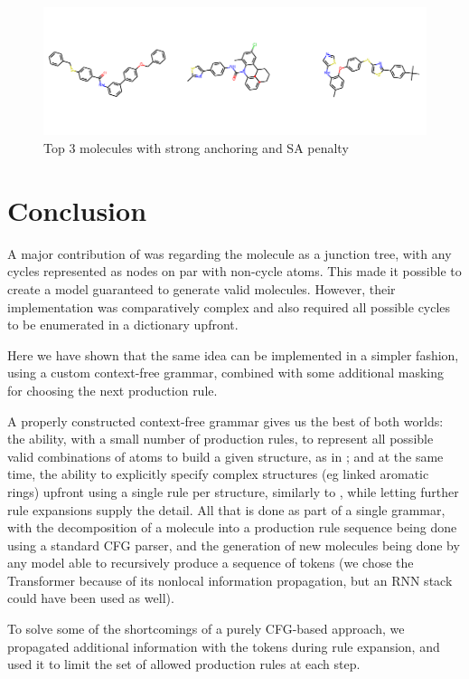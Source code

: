 \documentclass{article}
\begin{document}
\begin{figure}[ht]
	\centering
	\includegraphics[width=\textwidth]{strong.pdf}
	\caption{Top 3 molecules with strong anchoring and SA penalty}\label{fig:strong}
\end{figure}


\section{Conclusion}
A major contribution of \cite{jin18} was regarding the molecule as a junction tree, with any cycles represented as nodes on par with non-cycle atoms. This made it possible to create a model guaranteed to generate valid molecules. However, their implementation was comparatively complex and also required all possible cycles to be enumerated in a dictionary upfront. 

Here we have shown that the same idea can be implemented in a simpler fashion, using a custom context-free grammar, combined with some additional masking for choosing the next production rule. 

A properly constructed context-free grammar gives us the best of both worlds: the ability, with a small number of production rules, to represent all possible valid combinations of atoms to build a given structure, as in \cite{kusner17}; and at the same time, the ability to explicitly specify complex structures (eg linked aromatic rings) upfront using a single rule per structure, similarly to \cite{jin18}, while letting further rule expansions supply the detail. All that is done as part of a single grammar, with the decomposition of a molecule into a production rule sequence being done using a standard CFG parser, and the generation of new molecules being done by any model able to recursively produce a sequence of tokens (we chose the Transformer because of its nonlocal information propagation, but an RNN stack could have been used as well).

To solve some of the shortcomings of a purely CFG-based approach, we propagated additional information with the tokens during rule expansion, and used it to limit the set of allowed production rules at each step. 
\end{document}
